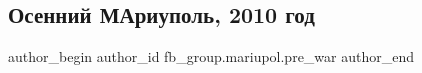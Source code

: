  
 
 
 
 

\subsection{Осенний МАриуполь, 2010 год}
\label{sec:13_02_2023.fb.fb_group.mariupol.pre_war.5.osennii_mariupol__20}

\ifcmt
 author_begin
   author_id fb_group.mariupol.pre_war
 author_end
\fi

